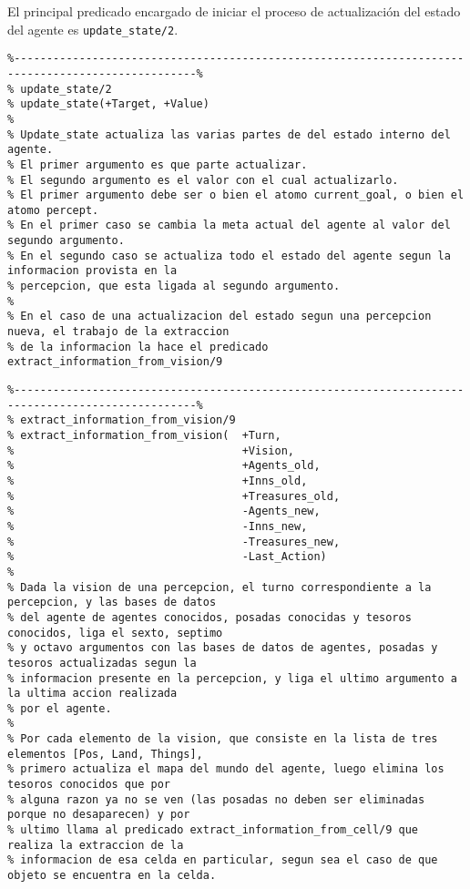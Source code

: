 \documentclass[a4paper,12pt]{report}
\begin{document}
El principal predicado encargado de iniciar el proceso de actualizaci\'{o}n del estado del agente 
es \texttt{update\_state/2}.

\begin{scriptsize}
\begin{verbatim}
%--------------------------------------------------------------------------------------------------%
% update_state/2
% update_state(+Target, +Value)
% 
% Update_state actualiza las varias partes de del estado interno del agente.
% El primer argumento es que parte actualizar.
% El segundo argumento es el valor con el cual actualizarlo.
% El primer argumento debe ser o bien el atomo current_goal, o bien el atomo percept.
% En el primer caso se cambia la meta actual del agente al valor del segundo argumento.
% En el segundo caso se actualiza todo el estado del agente segun la informacion provista en la 
% percepcion, que esta ligada al segundo argumento.
%
% En el caso de una actualizacion del estado segun una percepcion nueva, el trabajo de la extraccion
% de la informacion la hace el predicado extract_information_from_vision/9
\end{verbatim}
\end{scriptsize}
        
\begin{scriptsize}
\begin{verbatim}
%--------------------------------------------------------------------------------------------------%
% extract_information_from_vision/9
% extract_information_from_vision(  +Turn,
%                                   +Vision,
%                                   +Agents_old,
%                                   +Inns_old,
%                                   +Treasures_old,
%                                   -Agents_new,
%                                   -Inns_new,
%                                   -Treasures_new,
%                                   -Last_Action)
% 
% Dada la vision de una percepcion, el turno correspondiente a la percepcion, y las bases de datos 
% del agente de agentes conocidos, posadas conocidas y tesoros conocidos, liga el sexto, septimo
% y octavo argumentos con las bases de datos de agentes, posadas y tesoros actualizadas segun la 
% informacion presente en la percepcion, y liga el ultimo argumento a la ultima accion realizada 
% por el agente.
%
% Por cada elemento de la vision, que consiste en la lista de tres elementos [Pos, Land, Things],
% primero actualiza el mapa del mundo del agente, luego elimina los tesoros conocidos que por
% alguna razon ya no se ven (las posadas no deben ser eliminadas porque no desaparecen) y por
% ultimo llama al predicado extract_information_from_cell/9 que realiza la extraccion de la 
% informacion de esa celda en particular, segun sea el caso de que objeto se encuentra en la celda.
\end{verbatim}
\end{scriptsize}
\end{document}
